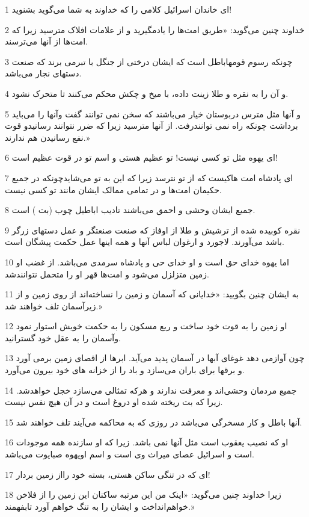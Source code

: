 \par 1 ای خاندان اسرائیل کلامی را که خداوند به شما می‌گوید بشنوید!
\par 2 خداوند چنین می‌گوید: «طریق امت‌ها را یادمگیرید و از علامات افلاک مترسید زیرا که امت‌ها از آنها می‌ترسند.
\par 3 چونکه رسوم قومهاباطل است که ایشان درختی از جنگل با تبرمی برند که صنعت دستهای نجار می‌باشد.
\par 4 و آن را به نقره و طلا زینت داده، با میخ و چکش محکم می‌کنند تا متحرک نشود.
\par 5 و آنها مثل مترس دربوستان خیار می‌باشند که سخن نمی توانند گفت وآنها را می‌باید برداشت چونکه راه نمی توانندرفت. از آنها مترسید زیرا که ضرر نتوانند رسانیدو قوت نفع رسانیدن هم ندارند.»
\par 6 ‌ای یهوه مثل تو کسی نیست! تو عظیم هستی و اسم تو در قوت عظیم است!
\par 7 ‌ای پادشاه امت هاکیست که از تو نترسد زیرا که این به تو می‌شایدچونکه در جمیع حکیمان امت‌ها و در تمامی ممالک ایشان مانند تو کسی نیست.
\par 8 جمیع ایشان وحشی و احمق می‌باشند تادیب اباطیل چوب (بت ) است.
\par 9 نقره کوبیده شده از ترشیش و طلا از اوفاز که صنعت صنعتگر و عمل دستهای زرگر باشد می‌آورند. لاجورد و ارغوان لباس آنها و همه اینها عمل حکمت پیشگان است.
\par 10 اما یهوه خدای حق است و او خدای حی و پادشاه سرمدی می‌باشد. از غضب او زمین متزلزل می‌شود و امت‌ها قهر او را متحمل نتوانندشد.
\par 11 به ایشان چنین بگویید: «خدایانی که آسمان و زمین را نساخته‌اند از روی زمین و از زیرآسمان تلف خواهند شد.»
\par 12 او زمین را به قوت خود ساخت و ربع مسکون را به حکمت خویش استوار نمود وآسمان را به عقل خود گسترانید.
\par 13 چون آوازمی دهد غوغای آبها در آسمان پدید می‌آید. ابرها از اقصای زمین برمی آورد و برقها برای باران می‌سازد و باد را از خزانه های خود بیرون می‌آورد.
\par 14 جمیع مردمان وحشی‌اند و معرفت ندارند و هر‌که تمثالی می‌سازد خجل خواهدشد. زیرا که بت ریخته شده او دروغ است و در آن هیچ نفس نیست.
\par 15 آنها باطل و کار مسخرگی می‌باشد در روزی که به محاکمه می‌آیند تلف خواهند شد.
\par 16 او که نصیب یعقوب است مثل آنها نمی باشد. زیرا که او سازنده همه موجودات است و اسرائیل عصای میراث وی است و اسم اویهوه صبایوت می‌باشد.
\par 17 ‌ای که در تنگی ساکن هستی، بسته خود رااز زمین بردار!
\par 18 زیرا خداوند چنین می‌گوید: «اینک من این مرتبه ساکنان این زمین را از فلاخن خواهم‌انداخت و ایشان را به تنگ خواهم آورد تابفهمند.»
